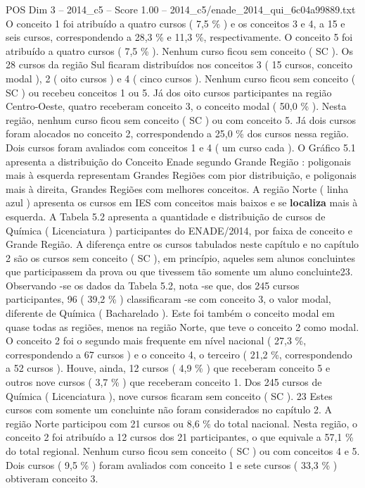 \begin{textsample}{POS Dim 3 – 2014\_c5 – Score 1.00 – 2014\_c5/enade\_2014\_qui\_6c04a99889.txt}
O conceito 1 foi atribuído a quatro cursos ( 7,5 \% ) e os conceitos 3 e 4, a 15 e seis cursos, correspondendo a 28,3 \% e 11,3 \%, respectivamente.
O conceito 5 foi atribuído a quatro cursos ( 7,5 \% ).
Nenhum curso ficou sem conceito ( SC ).
Os 28 cursos da região Sul ficaram distribuídos nos conceitos 3 ( 15 cursos, conceito modal ), 2 ( oito cursos ) e 4 ( cinco cursos ).
Nenhum curso ficou sem conceito ( SC ) ou recebeu conceitos 1 ou 5.
Já dos oito cursos participantes na região Centro-Oeste, quatro receberam conceito 3, o conceito modal ( 50,0 \% ).
Nesta região, nenhum curso ficou sem conceito ( SC ) ou com conceito 5.
Já dois cursos foram alocados no conceito 2, correspondendo a 25,0 \% dos cursos nessa região.
Dois cursos foram avaliados com conceitos 1 e 4 ( um curso cada ).
O Gráfico 5.1 apresenta a distribuição do Conceito Enade segundo Grande Região : poligonais mais à esquerda representam Grandes Regiões com pior distribuição, e poligonais mais à direita, Grandes Regiões com melhores conceitos.
A região Norte ( linha azul ) apresenta os cursos em IES com conceitos mais baixos e se \textbf{localiza} mais à esquerda.
A Tabela 5.2 apresenta a quantidade e distribuição de cursos de Química ( Licenciatura ) participantes do ENADE/2014, por faixa de conceito e Grande Região.
A diferença entre os cursos tabulados neste capítulo e no capítulo 2 são os cursos sem conceito ( SC ), em princípio, aqueles sem alunos concluintes que participassem da prova ou que tivessem tão somente um aluno concluinte23.
Observando -se os dados da Tabela 5.2, nota -se que, dos 245 cursos participantes, 96 ( 39,2 \% ) classificaram -se com conceito 3, o valor modal, diferente de Química ( Bacharelado ).
Este foi também o conceito modal em quase todas as regiões, menos na região Norte, que teve o conceito 2 como modal.
O conceito 2 foi o segundo mais frequente em nível nacional ( 27,3 \%, correspondendo a 67 cursos ) e o conceito 4, o terceiro ( 21,2 \%, correspondendo a 52 cursos ).
Houve, ainda, 12 cursos ( 4,9 \% ) que receberam conceito 5 e outros nove cursos ( 3,7 \% ) que receberam conceito 1.
Dos 245 cursos de Química ( Licenciatura ), nove cursos ficaram sem conceito ( SC ). 23 Estes cursos com somente um concluinte não foram considerados no capítulo 2.
A região Norte participou com 21 cursos ou 8,6 \% do total nacional.
Nesta região, o conceito 2 foi atribuído a 12 cursos dos 21 participantes, o que equivale a 57,1 \% do total regional.
Nenhum curso ficou sem conceito ( SC ) ou com conceitos 4 e 5.
Dois cursos ( 9,5 \% ) foram avaliados com conceito 1 e sete cursos ( 33,3 \% ) obtiveram conceito 3.

\end{textsample}
